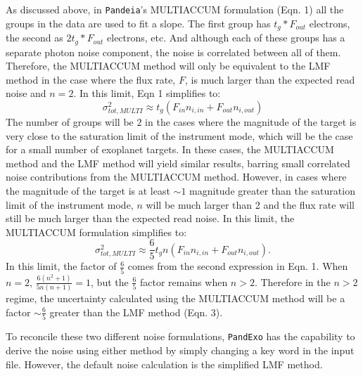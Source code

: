\documentclass[iop]{emulateapj}
\begin{document}
As discussed above, in \texttt{Pandeia}'s MULTIACCUM formulation (Eqn. 1) all the groups in the data are used to fit a slope. The first group has $t_g*F_{out}$ electrons, the second as $2t_g*F_{out}$ electrons, etc. And although each of these groups has a separate photon noise component, the noise is correlated between all of them. Therefore, the MULTIACCUM method will only be equivalent to the LMF method in the case where the flux rate, $F$, is much larger than the expected read noise and $n=2$. In this limit, Eqn 1 simplifies to: 
\begin{equation}
    \sigma_{tot,MULTI}^2 \approx t_g(F_{in}n_{i,in}  + F_{out}n_{i,out} )
\end{equation}
The number of groups will be $2$ in the cases where the magnitude of the target is very close to the saturation limit of the instrument mode, which will be the case for a small number of exoplanet targets. In these cases, the MULTIACCUM method and the LMF method will yield similar results, barring small correlated noise contributions from the MULTIACCUM method. However, in cases where the magnitude of the target is at least $\sim1$ magnitude greater than the saturation limit of the instrument mode, $n$ will be much larger than 2 and the flux rate will still be much larger than the expected read noise. In this limit, the MULTIACCUM formulation simplifies to:
\begin{equation}
    \sigma_{tot,MULTI}^2 \approx \frac{6}{5}t_gn (F_{in}n_{i,in}  + F_{out}n_{i,out}).
\end{equation}
In this limit, the factor of $\frac{6}{5}$ comes from the second expression in Eqn. 1. When $n=2$, $\frac{6(n^2+1)}{5n(n+1)} = 1$, but the $\frac{6}{5}$ factor remains when $n>2$. Therefore in the $n>2$ regime, the uncertainty calculated using the MULTIACCUM method will be a factor $\sim \frac{6}{5}$ greater than the LMF method (Eqn. 3). 

To reconcile these two different noise formulations, \texttt{PandExo} has the capability to derive the noise using either method by simply changing a key word in the input file. However, the default noise calculation is the simplified LMF method. 
\end{document}
